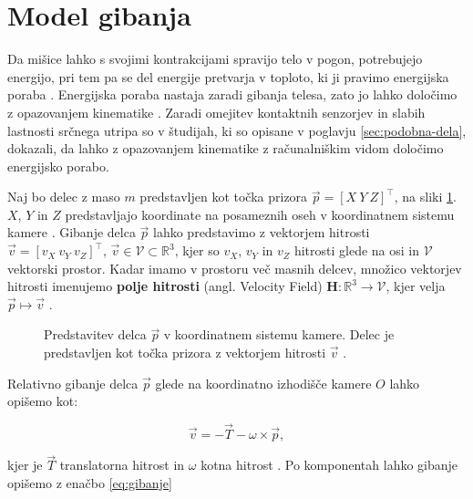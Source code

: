 \section{Model gibanja}\label{sec:model-gibanja}
Da mišice lahko s svojimi kontrakcijami spravijo telo v pogon, potrebujejo energijo, pri tem pa se del energije pretvarja v toploto, ki ji pravimo energijska poraba \cite{scott2005misconceptions}. Energijska poraba nastaja zaradi gibanja telesa, zato jo lahko določimo z opazovanjem kinematike \cite{levine2005measurement}. Zaradi omejitev kontaktnih senzorjev in slabih lastnosti srčnega utripa so v študijah, ki so opisane v poglavju \ref{sec:podobna-dela}, dokazali, da lahko z opazovanjem kinematike z računalniškim vidom določimo energijsko porabo. 

Naj bo delec z maso $m$ predstavljen kot točka prizora $\vec{p} = [X~Y~Z]^\top$, na sliki \ref{fig:model-gibanja}. $X$, $Y$ in $Z$ predstavljajo koordinate na posameznih oseh v koordinatnem sistemu kamere \cite{trucco1998introductory}. Gibanje delca $\vec{p}$ lahko predstavimo z vektorjem hitrosti $\vec{v} = [v_X~v_Y~v_Z]^\top$, $\vec{v} \in \mathcal{V} \subset \mathbb{R}^3$, kjer so $v_X$, $v_Y$ in $v_Z$ hitrosti glede na osi in $\mathcal{V}$ vektorski prostor. Kadar imamo v prostoru več masnih delcev, množico vektorjev hitrosti imenujemo \textbf{polje hitrosti} (angl. Velocity Field) $\mathbf{H}: \mathbb{R}^3 \to \mathcal{V}$, kjer velja $\vec{p} \mapsto \vec{v}$ \cite{trucco1998introductory}.


\begin{figure}
\centering

\caption[Predstavitev delca $\vec{p}$ v koordinatnem sistemu kamere]{Predstavitev delca $\vec{p}$ v koordinatnem sistemu kamere. Delec je predstavljen kot točka prizora z vektorjem hitrosti $\vec{v}$ \cite{trucco1998introductory}.}
\label{fig:model-gibanja}
\end{figure}




Relativno gibanje delca $\vec{p}$ glede na koordinatno izhodišče kamere $O$ lahko opišemo kot:

\begin{equation}
	\vec{v} = -\vec{T}-\omega\times\vec{p},
\end{equation}

kjer je $\vec{T}$ translatorna hitrost in $\omega$ kotna hitrost \cite{trucco1998introductory}. Po komponentah lahko gibanje opišemo z enačbo \eqref{eq:gibanje}

